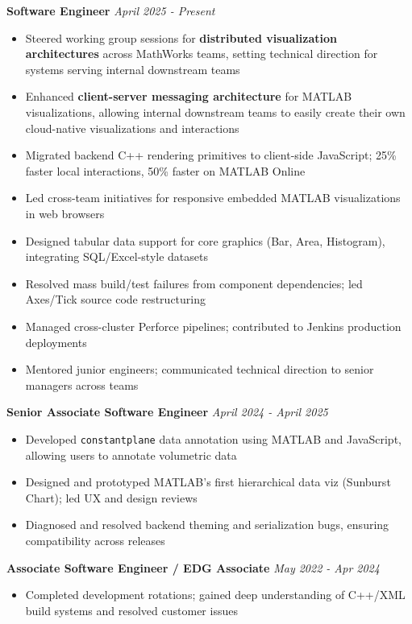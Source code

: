 \documentclass{article}
\begin{document}
{\large \textbf{Software Engineer}} \hfill \textit{April 2025 - Present}
\begin{itemize}[leftmargin=*]
    \item Steered working group sessions for \textbf{distributed visualization architectures} across MathWorks teams, setting technical direction for systems serving internal downstream teams
    \item Enhanced \textbf{client-server messaging architecture} for MATLAB visualizations, allowing internal downstream teams to easily create their own cloud-native visualizations and interactions
    \item Migrated backend C++ rendering primitives to client-side JavaScript; 25\% faster local interactions, 50\% faster on MATLAB Online
    \item Led cross-team initiatives for responsive embedded MATLAB visualizations in web browsers
    \item Designed tabular data support for core graphics (Bar, Area, Histogram), integrating SQL/Excel-style datasets
    \item Resolved mass build/test failures from component dependencies; led Axes/Tick source code restructuring
    \item Managed cross-cluster Perforce pipelines; contributed to Jenkins production deployments
    \item Mentored junior engineers; communicated technical direction to senior managers across teams
\end{itemize}

{\large \textbf{Senior Associate Software Engineer}} \hfill \textit{April 2024 - April 2025}
\begin{itemize}[leftmargin=*]
    \item Developed \texttt{constantplane} data annotation using MATLAB and JavaScript, allowing users to annotate volumetric data
    \item Designed and prototyped MATLAB's first hierarchical data viz (Sunburst Chart); led UX and design reviews
    \item Diagnosed and resolved backend theming and serialization bugs, ensuring compatibility across releases
\end{itemize}

{\large \textbf{Associate Software Engineer / EDG Associate}} \hfill \textit{May 2022 - Apr 2024}
\begin{itemize}[leftmargin=*]
    \item Completed development rotations; gained deep understanding of C++/XML build systems and resolved customer issues
\end{itemize}
\end{document}
